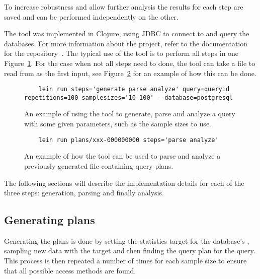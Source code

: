 To increase robustness and allow further analysis the results for each step are
saved and can be performed independently on the other.

The tool was implemented in Clojure, using JDBC to connect to and query the
databases. For more information about the project, refer to the documentation for
the repository~\cite{barksten_mbark_m}. The typical use of the tool is to perform all steps in one
Figure~\ref{fig:cmd:runtool1}. For the case when not all steps need to done, the
tool can take a file to read from as the first input, see
Figure~\ref{fig:cmd:runtool2} for an example of how this can be done.

\begin{figure}[ht]
  \begin{verbatim}
    lein run steps='generate parse analyze' query=queryid repetitions=100 samplesizes='10 100' --database=postgresql
  \end{verbatim}
  \caption[Using the tool to generate, parse and analyze a query]{An example of
    using the tool to generate, parse and analyze a query with some given
    parameters, such as the sample sizes to use.}\label{fig:cmd:runtool1}
\end{figure}

\begin{figure}[ht]
  \begin{verbatim}
    lein run plans/xxx-000000000 steps='parse analyze'
  \end{verbatim}
  \caption[Using the tool to parse and analyze a previously generated plan]{An
    example of how the tool can be used to parse and analyze a previously
    generated file containing query plans.}\label{fig:cmd:runtool2}
\end{figure}

The following sections will describe the implementation details for each of the
three steps: generation, parsing and finally analysis.

\subsection{Generating plans}\label{sec:generatingplans}
Generating the plans is done by setting the statistics target for the database's
, sampling new data with the target and then finding the query plan for
the query. This process is then repeated a number of times for each sample size
to ensure that all possible access methods are found.

